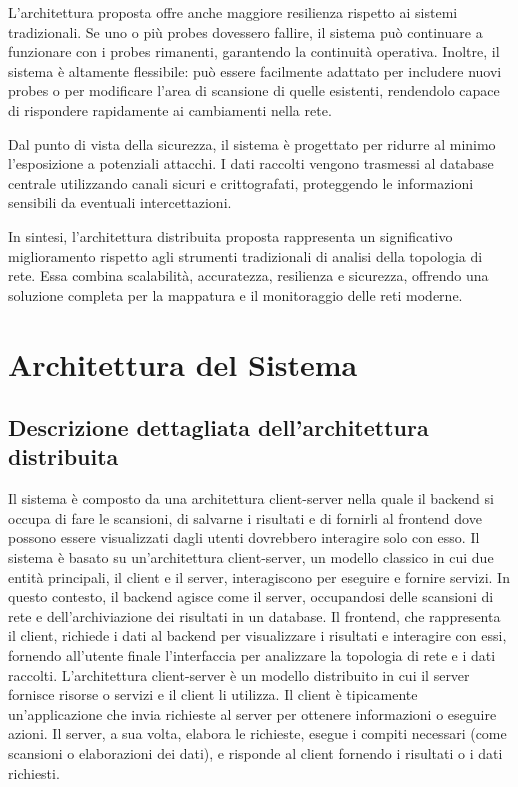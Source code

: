 \documentclass[target=bach,aauheader=,style=]{thud}
\begin{document}
L'architettura proposta offre anche maggiore resilienza rispetto ai sistemi tradizionali. Se uno o più probes dovessero fallire, il sistema può continuare a funzionare con i probes rimanenti, garantendo la continuità operativa. Inoltre, il sistema è altamente flessibile: può essere facilmente adattato per includere nuovi probes o per modificare l'area di scansione di quelle esistenti, rendendolo capace di rispondere rapidamente ai cambiamenti nella rete.

Dal punto di vista della sicurezza, il sistema è progettato per ridurre al minimo l'esposizione a potenziali attacchi. I dati raccolti vengono trasmessi al database centrale utilizzando canali sicuri e crittografati, proteggendo le informazioni sensibili da eventuali intercettazioni.

In sintesi, l'architettura distribuita proposta rappresenta un significativo miglioramento rispetto agli strumenti tradizionali di analisi della topologia di rete. Essa combina scalabilità, accuratezza, resilienza e sicurezza, offrendo una soluzione completa per la mappatura e il monitoraggio delle reti moderne.

\newpage
\section{Architettura del Sistema}
\subsection{Descrizione dettagliata dell'architettura distribuita}
Il sistema è composto da una architettura client-server \cite{orfali1999client} nella quale il backend si occupa di fare le scansioni, di salvarne i risultati e di fornirli al frontend dove possono essere visualizzati dagli utenti dovrebbero interagire solo con esso. 
Il sistema è basato su un'architettura client-server, un modello classico in cui due entità principali, il client e il server, interagiscono per eseguire e fornire servizi. In questo contesto, il backend agisce come il server, occupandosi delle scansioni di rete e dell'archiviazione dei risultati in un database. Il frontend, che rappresenta il client, richiede i dati al backend per visualizzare i risultati e interagire con essi, fornendo all'utente finale l'interfaccia per analizzare la topologia di rete e i dati raccolti.
L'architettura client-server è un modello distribuito in cui il server fornisce risorse o servizi e il client li utilizza. Il client è tipicamente un'applicazione che invia richieste al server per ottenere informazioni o eseguire azioni. Il server, a sua volta, elabora le richieste, esegue i compiti necessari (come scansioni o elaborazioni dei dati), e risponde al client fornendo i risultati o i dati richiesti.
\end{document}
